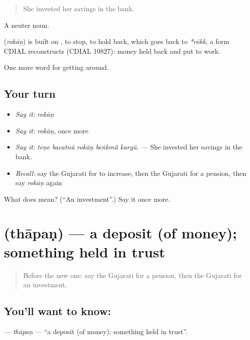 \begin{quote}
She invested her savings in the bank.
\end{quote}

A neuter noun.

\begin{cousinweb}
\textbf{} (\emph{rokāṇ}) is built on , to stop, to hold back, which goes back to \emph{*rōkk}, a form CDIAL reconstructs (CDIAL 10827): money held back and put to work.
\end{cousinweb}

\begin{grammarlens}[title={What you've built}]
One more word for getting around.
\end{grammarlens}

\subsection*{Your turn}
\begin{itemize}
\raggedright
  \item \emph{Say it:} \emph{rokāṇ}
  \item \emph{Say it:} \emph{rokāṇ}, once more
  \item \emph{Say it:} \emph{teṇe bacatnũ rokāṇ beṅkmā̃ karyũ.} — She invested her savings in the bank.
  \item \emph{Recall:} say the Gujarati for to increase, then the Gujarati for a pension, then say \emph{rokāṇ} again
\end{itemize}

\begin{tcolorbox}[breakable,colback=teal!4,colframe=teal!35!black,title={Before you move on}]
What does  mean? (\textquotedblleft{}An investment\textquotedblright{}.) Say it once more.
\end{tcolorbox}
\section[\texorpdfstring{\gu{થાપણ} (thāpaṇ)}{થાપણ (thāpaṇ)}]{ (thāpaṇ) — a deposit (of money); something held in trust}

\label{lesson:GU-C427-thapan}



\begin{quote}
Before the new one: say the Gujarati for a pension, then the Gujarati for an investment.
\end{quote}

\subsection*{You'll want to know: }
\textbf{} — \emph{thāpaṇ} — \textquotedblleft{}a deposit (of money); something held in trust\textquotedblright{}.

